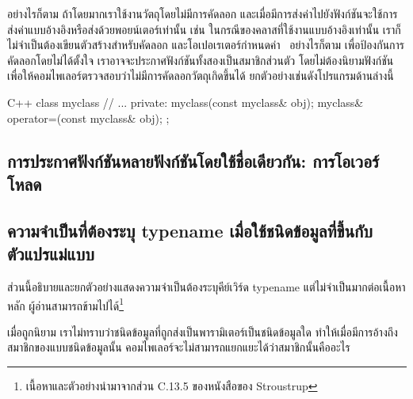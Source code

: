 อย่างไรก็ตาม ถ้า{\wbr}โดยมาก{\wbr}เรา{\wbr}ใช้{\wbr}งาน{\wbr}วัตถุ{\wbr}โดย{\wbr}ไม่{\wbr}มี{\wbr}การ{\wbr}คัดลอก{\wbr}
และ{\wbr}เมื่อ{\wbr}มี{\wbr}การ{\wbr}ส่ง{\wbr}ค่า{\wbr}ไป{\wbr}ยัง{\wbr}ฟังก์ชัน{\wbr}จะ{\wbr}ใช้{\wbr}การ{\wbr}ส่ง{\wbr}ค่า{\wbr}แบบ{\wbr}อ้างอิง{\wbr}หรือ{\wbr}ส่ง{\wbr}ด้วย{\wbr}พอยน์เตอร์{\wbr}เท่านั้น เช่น{\wbr}
ใน{\wbr}กรณี{\wbr}ของ{\wbr}ค{\wbr}ลา{\wbr}ส{\wbr}ที่{\wbr}ใช้{\wbr}งาน{\wbr}แบบ{\wbr}อ้างอิง{\wbr}เท่านั้น เรา{\wbr}ก็{\wbr}ไม่{\wbr}จำเป็น{\wbr}ต้อง{\wbr}เขียน{\wbr}ตัว{\wbr}สร้าง{\wbr}สำหรับ{\wbr}คัดลอก{\wbr}
และ{\wbr}โอ{\wbr}เปอเรเตอร์{\wbr}กำหนด{\wbr}ค่า \ อย่างไรก็ตาม เพื่อ{\wbr}ป้องกัน{\wbr}การ{\wbr}คัดลอก{\wbr}โดย{\wbr}ไม่{\wbr}ได้{\wbr}ตั้งใจ{\wbr}
เรา{\wbr}อาจ{\wbr}จะ{\wbr}ประกาศ{\wbr}ฟังก์ชัน{\wbr}ทั้ง{\wbr}สอง{\wbr}เป็น{\wbr}สมาชิก{\wbr}ส่วนตัว โดย{\wbr}ไม่{\wbr}ต้อง{\wbr}นิยาม{\wbr}ฟังก์ชัน{\wbr}
เพื่อให้{\wbr}คอม{\wbr}ไพ{\wbr}เลอร์{\wbr}ตรวจสอบ{\wbr}ว่า{\wbr}ไม่{\wbr}มี{\wbr}การ{\wbr}คัดลอก{\wbr}วัตถุ{\wbr}เกิด{\wbr}ขึ้น{\wbr}ได้  ยก{\wbr}ตัวอย่าง{\wbr}เช่น{\wbr}ดัง{\wbr}โปรแกรม{\wbr}ด้าน{\wbr}ล่าง{\wbr}นี้{\wbr}

\latintext
\begin{codelist}{C++}{}
class myclass {
  // ...
private:
  myclass(const myclass& obj);
  myclass& operator=(const myclass& obj);
};
\end{codelist}
\thaitext

\subsection{การ{\wbr}ประกาศ{\wbr}ฟังก์ชัน{\wbr}หลาย{\wbr}ฟังก์ชัน{\wbr}โดย{\wbr}ใช้{\wbr}ชื่อ{\wbr}เดียวกัน: การ{\wbr}โอ{\wbr}เวอร์{\wbr}โหลด}

\subsection{ความจำ{\wbr}เป็น{\wbr}ที่{\wbr}ต้อง{\wbr}ระบุ {\ct typename} เมื่อ{\wbr}ใช้{\wbr}ชนิด{\wbr}ข้อมูล{\wbr}ที่{\wbr}ขึ้น{\wbr}กับ{\wbr}ตัวแปร{\wbr}แม่แบบ}

ส่วน{\wbr}นี้{\wbr}อธิบาย{\wbr}และ{\wbr}ยก{\wbr}ตัวอย่าง{\wbr}แสดง{\wbr}ความจำ{\wbr}เป็น{\wbr}ต้อง{\wbr}ระบุ{\wbr}คีย์{\wbr}เวิร์ด {\ct typename}
แต่{\wbr}ไม่{\wbr}จำเป็น{\wbr}มาก{\wbr}ต่อ{\wbr}เนื้อหา{\wbr}หลัก{\wbr}
ผู้อ่าน{\wbr}สามารถ{\wbr}ข้าม{\wbr}ไป{\wbr}ได้\footnote{เนื้อหา{\wbr}และ{\wbr}ตัวอย่าง{\wbr}นำมา{\wbr}จาก{\wbr}ส่วน C.13.5 ของ{\wbr}หนังสือ{\wbr}ของ{\wbr}
  Stroustrup}

เมื่อ{\wbr}ถูก{\wbr}นิยาม เรา{\wbr}ไม่{\wbr}ทราบ{\wbr}ว่า{\wbr}ชนิด{\wbr}ข้อมูล{\wbr}ที่{\wbr}ถูก{\wbr}ส่ง{\wbr}เป็น{\wbr}พารามิเตอร์{\wbr}เป็น{\wbr}ชนิด{\wbr}ข้อมูล{\wbr}ใด{\wbr}
ทำ{\wbr}ให้{\wbr}เมื่อ{\wbr}มี{\wbr}การ{\wbr}อ้าง{\wbr}ถึง{\wbr}สมาชิก{\wbr}ของ{\wbr}แบบ{\wbr}ชนิด{\wbr}ข้อมูล{\wbr}นั้น{\wbr}
คอม{\wbr}ไพ{\wbr}เลอร์{\wbr}จะ{\wbr}ไม่{\wbr}สามารถ{\wbr}แยกแยะ{\wbr}ได้{\wbr}ว่า{\wbr}สมาชิก{\wbr}นั้น{\wbr}คือ{\wbr}อะไร{\wbr}

